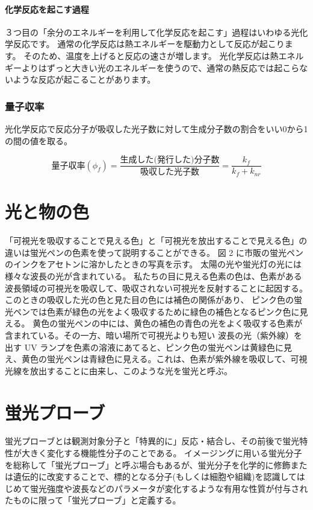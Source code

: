 \documentclass[a4paper,papersize,dvipdfmx]{jsarticle}
\begin{document}
\subsection{化学反応を起こす過程}
３つ目の「余分のエネルギーを利用して化学反応を起こす」過程はいわゆる光化学反応です。
通常の化学反応は熱エネルギーを駆動力として反応が起こります。
そのため、温度を上げると反応の速さが増します。
光化学反応は熱エネルギーよりはずっと大きい光のエネルギーを使うので、通常の熱反応では起こらないような反応が起こることがあります。

\section{量子収率}
光化学反応で反応分子が吸収した光子数に対して生成分子数の割合をいい0から1の間の値を取る。

\[\mbox{量子収率}(\phi_f) = \frac{\mbox{生成した(発行した)分子数}}{\mbox{吸収した光子数}} = \frac{k_f}{k_f+k_{nr}}\]

\part{光と物の色}
「可視光を吸収することで見える色」と「可視光を放出することで見える色」の違いは蛍光ペンの色素を使って説明することができる。
図 2 に市販の蛍光ペンのインクをアセトンに溶かしたときの写真を示す。
太陽の光や蛍光灯の光には様々な波長の光が含まれている。
私たちの目に見える色素の色は、色素がある波長領域の可視光を吸収して、吸収されない可視光を反射することに起因する。
このときの吸収した光の色と見た目の色には補色の関係があり、
ピンク色の蛍光ペンでは色素が緑色の光をよく吸収するために緑色の補色となるピンク色に見える。
黄色の蛍光ペンの中には、黄色の補色の青色の光をよく吸収する色素が含まれている。その一方、暗い場所で可視光よりも短い
波長の光（紫外線）を出す UV ランプを色素の溶液にあてると、ピンク色の蛍光ペンは黄緑色に見え、黄色の蛍光ペンは青緑色に見える。これは、色素が紫外線を吸収して、可視光線を放出することに由来し、このような光を蛍光と呼ぶ。

\part{蛍光プローブ}
蛍光プローブとは観測対象分子と「特異的に」反応・結合し、その前後で蛍光特性が大きく変化する機能性分子のことである。
イメージングに用いる蛍光分子を総称して「蛍光プローブ」と呼ぶ場合もあるが、蛍光分子を化学的に修飾または遺伝的に改変することで、標的となる分子(もしくは細胞や組織)を認識してはじめて蛍光強度や波長などのパラメータが変化するような有用な性質が付与されたものに限って「蛍光プローブ」と定義する。
\end{document}
